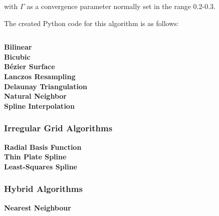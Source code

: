 				with $\Gamma$ as a convergence parameter normally set in the range 0.2-0.3.

				The created Python code for this algorithm is as follows:

				\inputminted[mathescape,linenos,numbersep=5pt,frame=lines,framesep=2mm]{python}{./code/barnes.py}

			\textbf{Bilinear}\label{datavalidation_bilinear} \\

				
			
			\textbf{Bicubic}\label{datavalidation_bicubic} \\
			
			\textbf{B\'{e}zier Surface}\label{datavalidation_beziersurface} \\
			
			\textbf{Lanczos Resampling}\label{datavalidation_lanczosresampling} \\
			
			\textbf{Delaunay Triangulation}\label{datavalidation_delaunaytriangulation} \\
			
			\textbf{Natural Neighbor}\label{datavalidation_naturalneighbour} \\
			
			\textbf{Spline Interpolation}\label{datavalidation_splineinterpolation} \\

		\subsubsection{Irregular Grid Algorithms}\label{datavalidation_irregular_grid}

			\textbf{Radial Basis Function}\label{datavalidation_radial_basis_function} \\

			\textbf{Thin Plate Spline}\label{datavalidation_thin_plate_spline} \\

			\textbf{Least-Squares Spline}\label{datavalidation_least_squares_spline} \\

		\subsubsection{Hybrid Algorithms}\label{datavalidation_hybrid_algorithms}

			\textbf{Nearest Neighbour}\label{datavalidation_nearest_neighbour} \\

